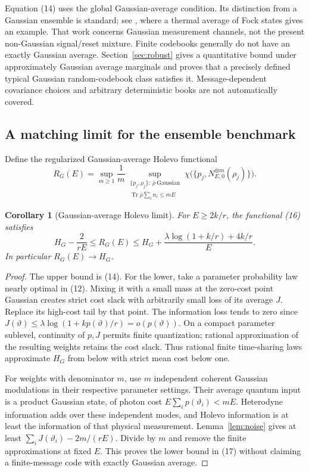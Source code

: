 \documentclass[11pt]{article}
\newtheorem{corollary}[theorem]{Corollary}
\newcommand{\Tr}{\operatorname{Tr}}
\begin{document}
Equation (14) uses the global Gaussian-average condition. Its
distinction from a Gaussian ensemble is standard; see
\cite[Remark 2]{holevoMeasurement}, where a thermal average of Fock
states gives an example. That work concerns Gaussian measurement
channels, not the present non-Gaussian signal/reset mixture.
Finite codebooks generally do not have an exactly Gaussian average.
Section~\ref{sec:robust} gives a quantitative bound under approximately
Gaussian average marginals and proves that a precisely defined typical
Gaussian random-codebook class satisfies it. Message-dependent covariance
choices and arbitrary deterministic books are not automatically covered.

\subsection{A matching limit for the ensemble benchmark}

Define the regularized Gaussian-average Holevo functional
\[
 R_G(E)=\sup_{m\geq1}\frac1m
 \sup_{\substack{\{p_j,\rho_j\}:\ \bar\rho\ \mathrm{Gaussian}\\
                   \Tr\bar\rho\sum_i n_i\leq mE}}
 \chi\bigl(\{p_j,N_{E,0}^{\otimes m}(\rho_j)\}\bigr).        \tag{16}
\]
\begin{corollary}[Gaussian-average Holevo limit]\label{cor:gausslimit}
For \(E\geq2k/r\), the functional (16) satisfies
\[
 H_G-\frac{2}{rE}\leq R_G(E)
 \leq H_G+\frac{\lambda\log(1+k/r)+4k/r}{E}.                \tag{17}
\]
In particular \(R_G(E)\to H_G\).
\end{corollary}
\begin{proof}
The upper bound is (14). For the lower, take a parameter probability law
nearly optimal in (12). Mixing it with a small mass at the zero-cost
point Gaussian creates strict cost slack with arbitrarily small loss
of its average \(J\). Replace its high-cost tail by that point. The
information loss tends to zero since
\(J(\vartheta)\leq\lambda\log(1+kp(\vartheta)/r)=o(p(\vartheta))\).
On a compact parameter sublevel, continuity of \(p,J\) permits finite
quantization; rational approximation of the resulting weights retains
the cost slack. Thus rational finite time-sharing laws approximate
\(H_G\) from below with strict mean cost below one.

For weights with denominator \(m\), use \(m\) independent coherent
Gaussian modulations in their respective parameter settings. Their
average quantum input is a product Gaussian state, of photon cost
\(E\sum_i p(\vartheta_i)<mE\). Heterodyne information adds over these
independent modes, and Holevo information is at least the information
of that physical measurement. Lemma~\ref{lem:noise} gives at least
\(\sum_i J(\vartheta_i)-2m/(rE)\). Divide by \(m\) and remove the
finite approximations at fixed \(E\). This proves the lower bound
in (17) without claiming a finite-message code with exactly Gaussian
average.
\end{proof}
\end{document}
